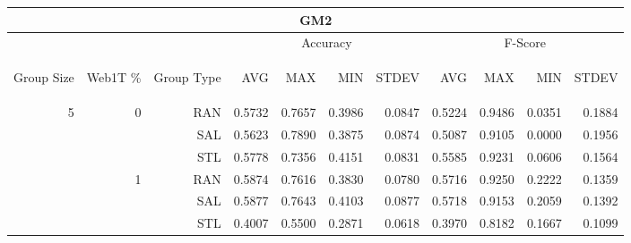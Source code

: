 \begin{center}
\begin{table}[htbp] 
 \begin{center}
\begin{tabular}{ | r | r | r | r | r | r | r | r | r | r | r |}
\hline
\multicolumn{11}{|c|}{GM2}\\
\hline
 & & & \multicolumn{4}{|c|}{Accuracy} & \multicolumn{4}{|c|}{F-Score}\\ \cline{4-11}
\begin{sideways}Group Size\end{sideways} & \begin{sideways}Web1T \%\end{sideways} & \begin{sideways}Group Type\end{sideways} & \begin{sideways}AVG\end{sideways} & \begin{sideways}MAX\end{sideways} & \begin{sideways}MIN\end{sideways} & \begin{sideways}STDEV\end{sideways} & \begin{sideways}AVG\end{sideways} & \begin{sideways}MAX\end{sideways} & \begin{sideways}MIN\end{sideways} & \begin{sideways}STDEV\end{sideways}\\
\hline
\multirow{18}{*}{5}
 & \multirow{3}{*}{0} & RAN & 0.5732 & 0.7657 & 0.3986 & 0.0847 & 0.5224 & 0.9486 & 0.0351 & 0.1884\\ \cline{3-11}
 &   & SAL & 0.5623 & 0.7890 & 0.3875 & 0.0874 & 0.5087 & 0.9105 & 0.0000 & 0.1956\\ \cline{3-11}
 &   & STL & 0.5778 & 0.7356 & 0.4151 & 0.0831 & 0.5585 & 0.9231 & 0.0606 & 0.1564\\ \cline{2-11}
 & \multirow{3}{*}{1} & RAN & 0.5874 & 0.7616 & 0.3830 & 0.0780 & 0.5716 & 0.9250 & 0.2222 & 0.1359\\ \cline{3-11}
 &   & SAL & 0.5877 & 0.7643 & 0.4103 & 0.0877 & 0.5718 & 0.9153 & 0.2059 & 0.1392\\ \cline{3-11}
 &   & STL & 0.4007 & 0.5500 & 0.2871 & 0.0618 & 0.3970 & 0.8182 & 0.1667 & 0.1099\\ \cline{2-11}

\end{tabular}
\end{center}
\end{table}
\end{center}
